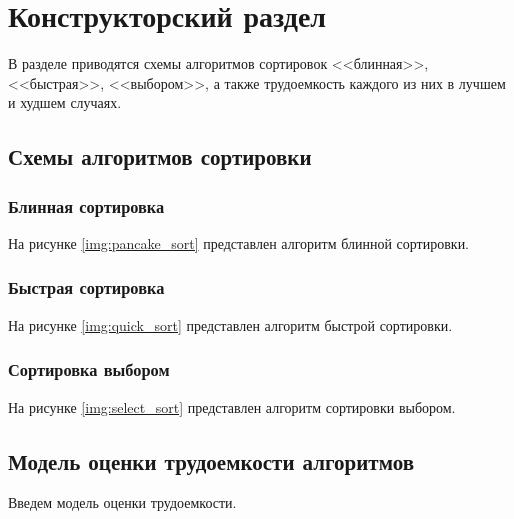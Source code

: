 \chapter{Конструкторский раздел}
В разделе приводятся схемы алгоритмов сортировок <<блинная>>, <<быстрая>>, <<выбором>>, а также трудоемкость каждого из них в лучшем и худшем случаях.
\section{Схемы алгоритмов сортировки}
\subsection{Блинная сортировка}
На рисунке \ref{img:pancake_sort} представлен алгоритм блинной сортировки. 
\subsection{Быстрая сортировка}
На рисунке \ref{img:quick_sort} представлен алгоритм быстрой сортировки. 
\subsection{Сортировка выбором}
На рисунке \ref{img:select_sort} представлен алгоритм сортировки выбором. 

\section{Модель оценки трудоемкости алгоритмов}
Введем модель оценки трудоемкости.

